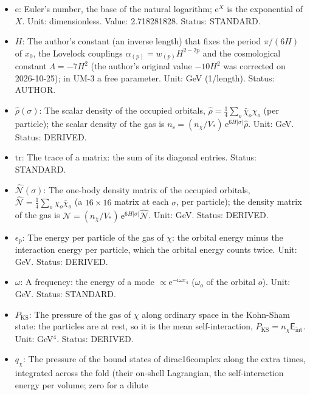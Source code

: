 \documentclass[
  10pt,
]{article}
\begin{document}
\begin{itemize}
  \(\infty\): Infinity: as a limit of an integral or a sum it means that
  the range has no bound. Status: STANDARD.
\item
  \(\mathrm{e}\): Euler's number, the base of the natural logarithm;
  \(\mathrm{e}^{X}\) is the exponential of \(X\). Unit: dimensionless.
  Value: 2.718281828. Status: STANDARD.
\item
  \(H\): The author's constant (an inverse length) that fixes the period
  \(\pi/(6H)\) of \(x_0\), the Lovelock couplings
  \(\alpha_{(p)} = w_{(p)}H^{2-2p}\) and the cosmological constant
  \(\Lambda = -7H^2\) (the author's original value \(-10H^2\) was
  corrected on 2026-10-25); in UM-3 a free parameter. Unit: GeV
  (1/length). Status: AUTHOR.
\item
  \(\hat\rho(\sigma)\): The scalar density of the occupied orbitals,
  \(\hat\rho = \frac14\sum_o\bar\chi_o\chi_o\) (per particle); the
  scalar density of the gas is
  \(n_{\mathrm{s}} = (n_\chi/V_*)\,\mathrm{e}^{6H\lvert\sigma\rvert}\hat\rho\).
  Unit: GeV. Status: DERIVED.
\item
  \(\mathrm{tr}\): The trace of a matrix: the sum of its diagonal
  entries. Status: STANDARD.
\item
  \(\hat{\mathcal{N}}(\sigma)\): The one-body density matrix of the
  occupied orbitals,
  \(\hat{\mathcal{N}} = \frac14\sum_o\chi_o\bar\chi_o\) (a
  \(16 \times 16\) matrix at each \(\sigma\), per particle); the density
  matrix of the gas is
  \(\mathcal{N} = (n_\chi/V_*)\,\mathrm{e}^{6H\lvert\sigma\rvert}\hat{\mathcal{N}}\).
  Unit: GeV. Status: DERIVED.
\item
  \(\epsilon_{\mathrm{p}}\): The energy per particle of the gas of
  \(\chi\): the orbital energy minus the interaction energy per
  particle, which the orbital energy counts twice. Unit: GeV. Status:
  DERIVED.
\item
  \(\omega\): A frequency: the energy of a mode
  \(\propto \mathrm{e}^{-\mathrm{i}\omega x_4}\) (\(\omega_o\) of the
  orbital \(o\)). Unit: GeV. Status: STANDARD.
\item
  \(P_{\mathrm{KS}}\): The pressure of the gas of \(\chi\) along
  ordinary space in the Kohn-Sham state: the particles are at rest, so
  it is the mean self-interaction,
  \(P_{\mathrm{KS}} = n_\chi\mathsf{E}_{\mathrm{int}}\). Unit:
  GeV\(^4\). Status: DERIVED.
\item
  \(q_\chi\): The pressure of the bound states of dirac16complex along
  the extra times, integrated across the fold (their on-shell
  Lagrangian, the self-interaction energy per volume; zero for a dilute

\end{itemize}
\end{document}
